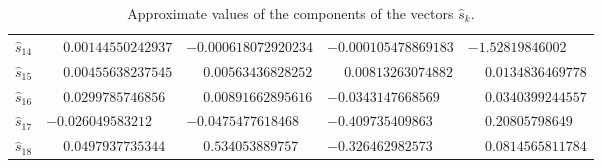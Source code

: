 \documentclass[1p]{article}
\begin{document}
\begin{table}[H]
\begin{tabular}{lllll}
        $\hat{s}_{14}$ & $\phantom{-}0.00144550242937$ & $-0.000618072920234$ & $-0.000105478869183$ & $-1.52819846002$ \\
        $\hat{s}_{15}$ & $\phantom{-}0.00455638237545$ & $\phantom{-}0.00563436828252$ & $\phantom{-}0.00813263074882$ & $\phantom{-}0.0134836469778$ \\
        $\hat{s}_{16}$ & $\phantom{-}0.0299785746856$ & $\phantom{-}0.00891662895616$ & $-0.0343147668569$ & $\phantom{-}0.0340399244557$ \\
        $\hat{s}_{17}$ & $-0.026049583212$ & $-0.0475477618468$ & $-0.409735409863$ & $\phantom{-}0.20805798649$ \\
        $\hat{s}_{18}$ & $\phantom{-}0.0497937735344$ & $\phantom{-}0.534053889757$ & $-0.326462982573$ & $\phantom{-}0.0814565811784$ \\
        \hline
    \end{tabular}
    \caption{Approximate values of the components of the vectors $\hat{s}_k$.}
    \label{table:sk}
\end{table}


 

\end{document}
